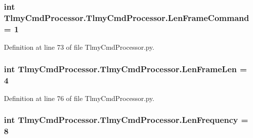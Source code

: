 \hypertarget{namespace_tlmy_cmd_processor_1_1_tlmy_cmd_processor_a64ebb9875c3f0f30fd7cd3b962d812f3}{}
\subsubsection[{Len\+Frame\+Command}]{\setlength{\rightskip}{0pt plus 5cm}int Tlmy\+Cmd\+Processor.\+Tlmy\+Cmd\+Processor.\+Len\+Frame\+Command = 1}\label{namespace_tlmy_cmd_processor_1_1_tlmy_cmd_processor_a64ebb9875c3f0f30fd7cd3b962d812f3}


Definition at line 73 of file Tlmy\+Cmd\+Processor.\+py.

\hypertarget{namespace_tlmy_cmd_processor_1_1_tlmy_cmd_processor_a4258f8620fd2045719a2170f64913b1f}{}
\subsubsection[{Len\+Frame\+Len}]{\setlength{\rightskip}{0pt plus 5cm}int Tlmy\+Cmd\+Processor.\+Tlmy\+Cmd\+Processor.\+Len\+Frame\+Len = 4}\label{namespace_tlmy_cmd_processor_1_1_tlmy_cmd_processor_a4258f8620fd2045719a2170f64913b1f}


Definition at line 76 of file Tlmy\+Cmd\+Processor.\+py.

\hypertarget{namespace_tlmy_cmd_processor_1_1_tlmy_cmd_processor_abac774909f35b54d636c7b68839964a4}{}
\subsubsection[{Len\+Frequency}]{\setlength{\rightskip}{0pt plus 5cm}int Tlmy\+Cmd\+Processor.\+Tlmy\+Cmd\+Processor.\+Len\+Frequency = 8}\label{namespace_tlmy_cmd_processor_1_1_tlmy_cmd_processor_abac774909f35b54d636c7b68839964a4}


